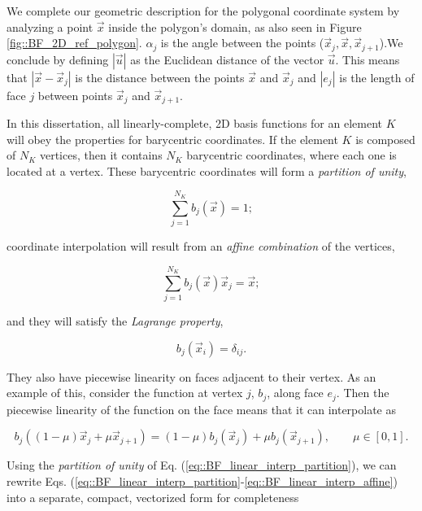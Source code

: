We complete our geometric description for the polygonal coordinate system by analyzing a point $\vec{x}$ inside the polygon's domain, as also seen in Figure \ref{fig::BF_2D_ref_polygon}. $\alpha_j$ is the angle between the points ($\vec{x}_j, \vec{x}, \vec{x}_{j+1}$).We conclude by defining $|\vec{u}|$ as the Euclidean distance of the vector $\vec{u}$. This means that $|\vec{x} - \vec{x}_j|$ is the distance between the points $\vec{x}$ and $\vec{x}_j$ and $|e_j|$ is the length of face $j$ between points $\vec{x}_j$ and $\vec{x}_{j+1}$.


In this dissertation, all linearly-complete, 2D basis functions for an element $K$ will obey the properties for barycentric coordinates. If the element $K$ is composed of $N_K$ vertices, then it contains $N_K$ barycentric coordinates, where each one is located at a vertex. These barycentric coordinates will form a {\em partition of unity},

\begin{equation}
\sum_{j=1}^{N_K} b_j (\vec{x})  =  1;
\label{eq::BF_linear_interp_partition}
\end{equation}

\noindent coordinate interpolation will result from an {\em affine combination} of the vertices,

\begin{equation}
\sum_{j=1}^{N_K} b_j (\vec{x}) \vec{x}_j  =  \vec{x};
\label{eq::BF_linear_interp_affine}
\end{equation}

\noindent and they will satisfy the {\em Lagrange property},

\begin{equation}
b_j (\vec{x}_i) = \delta_{ij}.
\label{eq::BF_linear_interp_lagrange}
\end{equation}

\noindent They also have piecewise linearity on faces adjacent to their vertex. As an example of this, consider the function at vertex $j$, $b_j$, along face $e_j$. Then the piecewise linearity of the function on the face means that it can interpolate as

\begin{equation}
\label{eq::BF_linear_bound_interp}
b_j ((1-\mu ) \vec{x}_j  + \mu \vec{x}_{j+1})  = (1-\mu ) b_j (\vec{x}_j ) + \mu b_j (\vec{x}_{j+1} ) , \qquad \mu \in [0,1].
\end{equation}

Using the {\em partition of unity} of Eq. (\ref{eq::BF_linear_interp_partition}), we can rewrite Eqs. (\ref{eq::BF_linear_interp_partition}-\ref{eq::BF_linear_interp_affine}) into a separate, compact, vectorized form for completeness

